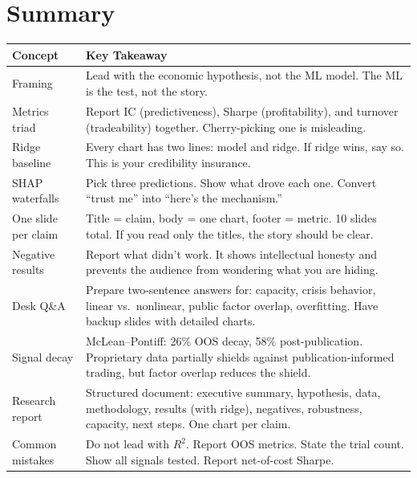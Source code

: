 \section{Summary}
\label{sec:presenting:summary}

\begin{center}
\begin{tabular}{p{4cm} p{9.5cm}}
  \toprule
  \textbf{Concept} & \textbf{Key Takeaway} \\
  \midrule
  Framing &
    Lead with the economic hypothesis, not the ML model.  The ML is the
    test, not the story. \\[4pt]
  Metrics triad &
    Report IC (predictiveness), Sharpe (profitability), and turnover
    (tradeability) together.  Cherry-picking one is misleading. \\[4pt]
  Ridge baseline &
    Every chart has two lines: model and ridge.  If ridge wins, say so.
    This is your credibility insurance. \\[4pt]
  SHAP waterfalls &
    Pick three predictions.  Show what drove each one.  Convert ``trust
    me'' into ``here's the mechanism.'' \\[4pt]
  One slide per claim &
    Title = claim, body = one chart, footer = metric.  10 slides total.
    If you read only the titles, the story should be clear. \\[4pt]
  Negative results &
    Report what didn't work.  It shows intellectual honesty and
    prevents the audience from wondering what you are hiding. \\[4pt]
  Desk Q\&A &
    Prepare two-sentence answers for: capacity, crisis behavior,
    linear vs.\ nonlinear, public factor overlap, overfitting.
    Have backup slides with detailed charts. \\[4pt]
  Signal decay &
    McLean--Pontiff: 26\% OOS decay, 58\% post-publication.
    Proprietary data partially shields against publication-informed
    trading, but factor overlap reduces the shield. \\[4pt]
  Research report &
    Structured document: executive summary, hypothesis, data,
    methodology, results (with ridge), negatives, robustness, capacity,
    next steps.  One chart per claim. \\[4pt]
  Common mistakes &
    Do not lead with $R^2$.  Report OOS metrics.  State the trial count.
    Show all signals tested.  Report net-of-cost Sharpe. \\
  \bottomrule
\end{tabular}
\end{center}
